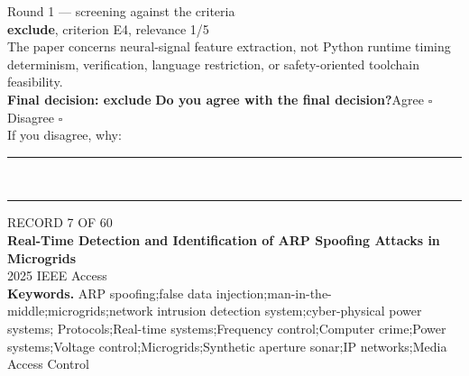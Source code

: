 \documentclass[11pt,a4paper]{article}
\begin{document}
{\footnotesize\color{soft}Round 1 --- screening against the criteria}\\[0.5mm]
{\small\textbf{exclude}, criterion E4, relevance 1/5}\\[0.5mm]
{\small The paper concerns neural-signal feature extraction, not Python runtime timing determinism, verification, language restriction, or safety-oriented toolchain feasibility.}\\[2.5mm]
{\small\textbf{Final decision: exclude}}
\vspace{2mm}
{\small\textbf{Do you agree with the final decision?}\quad{}Agree $\square$\qquad{}Disagree $\square$}\\[1mm]
{\footnotesize\color{soft}If you disagree, why:}\\[1mm]
\color{rule}\rule{\linewidth}{0.3pt}\\[3mm]\rule{\linewidth}{0.3pt}\color{black}
\clearpage
{\color{soft}\footnotesize RECORD 7 OF 60}\\[1mm]
{\large\bfseries Real-Time Detection and Identification of ARP Spoofing Attacks in Microgrids}\\[1.5mm]
{\color{soft}\small 2025 \textperiodcentered{} IEEE Access}\\[2mm]
{\small\textbf{Keywords.} ARP spoofing;false data injection;man-in-the-middle;microgrids;network intrusion detection system;cyber-physical power systems; Protocols;Real-time systems;Frequency control;Computer crime;Power systems;Voltage control;Microgrids;Synthetic aperture sonar;IP networks;Media Access Control}\\[2mm]
\end{document}
